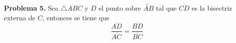 \documentclass{article}
\begin{document}
\vspace{5mm}
\noindent\textbf{Problema 5.} Sea $\triangle ABC$ y $D$ el punto sobre $\overleftrightarrow{AB}$ 
tal que $\overline{CD}$ es la bisectriz externa de $C$, entonces se tiene que
\begin{equation*}
    \frac{\overline{AD}}{\overline{AC}}=\frac{\overline{BD}}{\overline{BC}}
\end{equation*}

\end{document}
